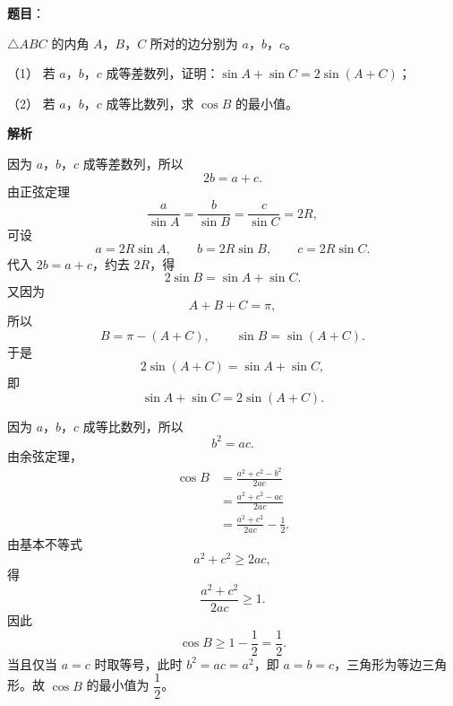 \begin{answer}

\textbf{题目}：

$\triangle ABC$ 的内角 $A$，$B$，$C$ 所对的边分别为 $a$，$b$，$c$。

（1） 若 $a$，$b$，$c$ 成等差数列，证明：$\sin A+\sin C=2\sin(A+C)$；

（2） 若 $a$，$b$，$c$ 成等比数列，求 $\cos B$ 的最小值。

\textbf{解析}


因为 $a$，$b$，$c$ 成等差数列，所以
\nopagebreak[4]
\[2b=a+c.\]
由正弦定理
\nopagebreak[4]
\[\frac a{\sin A}=\frac b{\sin B}=\frac c{\sin C}=2R,\]
可设
\nopagebreak[4]
\[a=2R\sin A,\qquad b=2R\sin B,\qquad c=2R\sin C.\]
代入 $2b=a+c$，约去 $2R$，得
\nopagebreak[4]
\[2\sin B=\sin A+\sin C.\]
又因为
\nopagebreak[4]
\[A+B+C=\pi,\]
所以
\nopagebreak[4]
\[B=\pi-(A+C),\qquad \sin B=\sin(A+C).\]
于是
\nopagebreak[4]
\[2\sin(A+C)=\sin A+\sin C,\]
即
\nopagebreak[4]
\[\sin A+\sin C=2\sin(A+C).\]


因为 $a$，$b$，$c$ 成等比数列，所以
\nopagebreak[4]
\[b^2=ac.\]
由余弦定理，
\nopagebreak[4]
\[\begin{aligned}
\cos B&=\frac{a^2+c^2-b^2}{2ac}\\
&=\frac{a^2+c^2-ac}{2ac}\\
&=\frac{a^2+c^2}{2ac}-\frac12.
\end{aligned}\]
由基本不等式
\nopagebreak[4]
\[a^2+c^2\geqslant2ac,\]
得
\nopagebreak[4]
\[\frac{a^2+c^2}{2ac}\geqslant1.\]
因此
\nopagebreak[4]
\[\cos B\geqslant1-\frac12=\frac12.\]
当且仅当 $a=c$ 时取等号，此时 $b^2=ac=a^2$，即 $a=b=c$，三角形为等边三角形。故 $\cos B$ 的最小值为 $\dfrac12$。



\end{answer}
